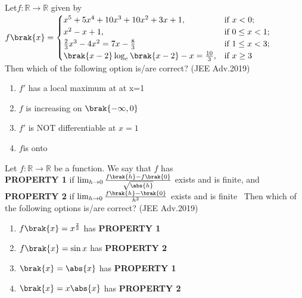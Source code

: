 \item %
Let$f:\mathbb{R} \to \mathbb{R}$ given by \\
$f\brak{x} = 
\begin{cases} 
x^5+5x^4+10x^3+10x^2+3x+1, & \text{if } x < 0; \\
x^2-x+1, & \text{if } 0 \leq x <1; \\
\frac{2}{3}x^3-4x^2=7x-\frac{8}{3} & \text{if } 1 \leq x <3; \\
\brak{x-2}\log_e\brak{x-2}-x=\frac{10}{3},& \text{if } x \geq 3
\end{cases}$ \\
Then which of the following option is/are correct?
\hfill  (JEE Adv.2019) \\
\begin{enumerate}
\item $f'$ has a local maximum at at x=1 
\item $f$ is increasing on $\brak{-\infty , 0}$
\item $f'$ is NOT differentiable at $x=1$
\item $f$is onto 
\end{enumerate} 
 \item %
 Let $f:\mathbb{R} \to \mathbb{R}$ be a function. We say that $f$ has \\
\textbf{PROPERTY 1} if $\lim_{h\to0}\frac{f\brak{h}-f\brak{0}}{\sqrt{\abs{h}}}$ exists and is finite, and \\
\textbf{PROPERTY 2} if $\lim_{h\to0}\frac{f\brak{h}-\brak{0}}{h^2}$ exists and is finite \
Then which of the following options is/are correct? 
\hfill (JEE Adv.2019) \\
\begin{enumerate}
\item $f\brak{x}=x^{\frac{2}{3}}$ has \textbf{PROPERTY 1} 
\item $f\brak{x}=\sin{x}$ has \textbf{PROPERTY 2} 
\item $\brak{x}=\abs{x}$ has \textbf{PROPERTY 1} 
\item $\brak{x}=x\abs{x}$ has \textbf{PROPERTY 2} 
\end{enumerate}

